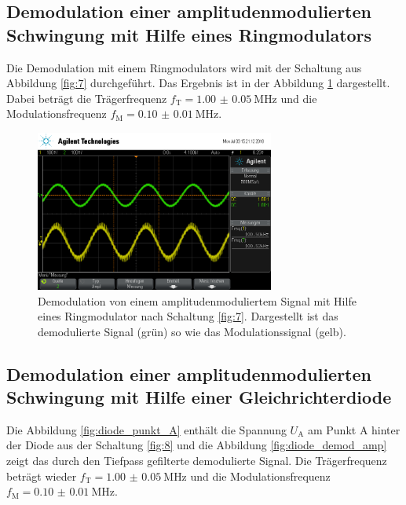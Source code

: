 \FloatBarrier
\subsection{Demodulation einer amplitudenmodulierten Schwingung
mit Hilfe eines Ringmodulators}
\label{subsubsec:auswertung_f}
Die Demodulation mit einem Ringmodulators wird mit der Schaltung
aus Abbildung \ref{fig:7} durchgeführt. Das Ergebnis ist
in der Abbildung \ref{fig:amp_demod_ring} dargestellt.
Dabei beträgt die Trägerfrequenz $f_{\text{T}}=\SI{1.00(5)}{\mega\hertz}$
und die Modulationsfrequenz $f_{\text{M}}=\SI{0.10(1)}{\mega\hertz}$.


\begin{figure}
  \centering
  \includegraphics[width=0.7\textwidth]{osci/amp_demod.png}
  \caption{Demodulation von einem amplitudenmoduliertem Signal mit Hilfe eines
  Ringmodulator nach Schaltung \ref{fig:7}. Dargestellt ist das demodulierte Signal (grün) so wie das Modulationssignal (gelb).}
  \label{fig:amp_demod_ring}
\end{figure}




\FloatBarrier
\subsection{Demodulation einer amplitudenmodulierten Schwingung
mit Hilfe einer Gleichrichterdiode}
\label{subsubsec:auswertung_g}
Die Abbildung \ref{fig:diode_punkt_A} enthält
die Spannung $U_{\text{A}}$ am Punkt A hinter der Diode aus der
Schaltung \ref{fig:8} und die Abbildung \ref{fig:diode_demod_amp}
zeigt das durch den Tiefpass gefilterte demodulierte Signal.
Die Trägerfrequenz beträgt wieder $f_{\text{T}}=\SI{1.00(5)}{\mega\hertz}$
und die Modulationsfrequenz $f_{\text{M}}=\SI{0.10(1)}{\mega\hertz}$.


